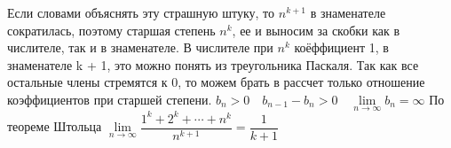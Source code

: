 \documentclass[11pt]{article}
\begin{document}
	Если словами объяснять эту страшную штуку, то $n^{k + 1}$ в знаменателе сократилась, поэтому старшая степень $n^k$, ее и выносим за скобки как в числителе, так и в знаменателе. В числителе при $n^k$ коёффициент 1, в знаменателе k + 1, это можно понять из треугольника Паскаля. Так как все остальные члены стремятся к 0, то можем брать в рассчет только отношение коэффициентов при старшей степени. \bs
	$b_n > 0 \quad b_{n - 1} - b_n > 0 \quad \lim\limits_{n\to \infty} b_n = \infty$ \sspace
	По теореме Штольца $\lim\limits_{n\to \infty} \dfrac{1^k + 2^k + \cdots + n^k}{n^{k + 1}} = \dfrac{1}{k + 1}$ \bs
\end{document}
